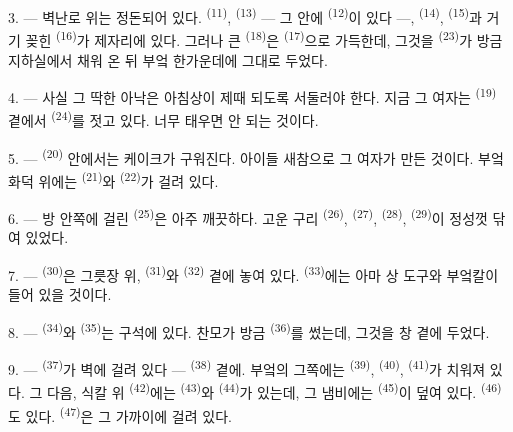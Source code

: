 3. --- 벽난로 위는 정돈되어 있다.  \textsuperscript{(11)},
 \textsuperscript{(13)} — 그 안에  \textsuperscript{(12)}이
있다 —,  \textsuperscript{(14)},  \textsuperscript{(15)}과
거기 꽂힌  \textsuperscript{(16)}가 제자리에 있다. 그러나 큰 
\textsuperscript{(18)}은  \textsuperscript{(17)}으로 가득한데, 그것을
 \textsuperscript{(23)}가 방금 지하실에서 채워 온 뒤 부엌 한가운데에 그대로
두었다.

4. --- 사실 그 딱한 아낙은 아침상이 제때 되도록 서둘러야 한다. 지금 그 여자는
 \textsuperscript{(19)} 곁에서  \textsuperscript{(24)}를
젓고 있다. 너무 태우면 안 되는 것이다.

5. ---  \textsuperscript{(20)} 안에서는 케이크가 구워진다. 아이들 새참으로
그 여자가 만든 것이다. 부엌 화덕 위에는  \textsuperscript{(21)}와
 \textsuperscript{(22)}가 걸려 있다.

\VUsaut{4.0mm}
\VUsaut{3.0mm}

6. --- 방 안쪽에 걸린  \textsuperscript{(25)}은 아주 깨끗하다. 고운
구리  \textsuperscript{(26)},  \textsuperscript{(27)},
 \textsuperscript{(28)},  \textsuperscript{(29)}이 정성껏
닦여 있었다.

7. ---  \textsuperscript{(30)}은 그릇장 위, 
\textsuperscript{(31)}와  \textsuperscript{(32)} 곁에 놓여 있다.
 \textsuperscript{(33)}에는 아마 상 도구와 부엌칼이 들어 있을 것이다.

8. ---  \textsuperscript{(34)}와  \textsuperscript{(35)}는
구석에 있다. 찬모가 방금  \textsuperscript{(36)}를 썼는데, 그것을 창
곁에 두었다.

9. ---  \textsuperscript{(37)}가 벽에 걸려 있다 — 
\textsuperscript{(38)} 곁에. 부엌의 그쪽에는  \textsuperscript{(39)},
 \textsuperscript{(40)},  \textsuperscript{(41)}가 치워져 있다.
그 다음, 식칼 위  \textsuperscript{(42)}에는 
\textsuperscript{(43)}와  \textsuperscript{(44)}가 있는데, 그 냄비에는
 \textsuperscript{(45)}이 덮여 있다.  \textsuperscript{(46)}도
있다.  \textsuperscript{(47)}은 그 가까이에 걸려 있다.

